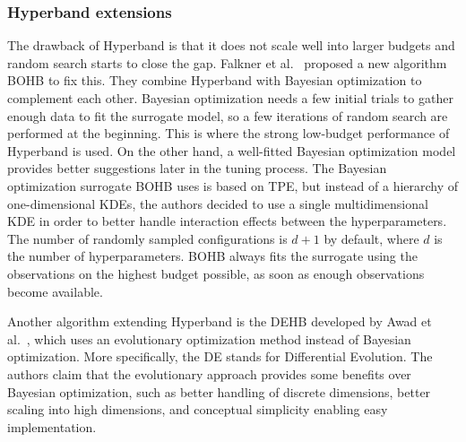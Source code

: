 \subsubsection{Hyperband extensions}
The drawback of Hyperband is that it does not scale well into larger budgets and random search starts to close the gap. Falkner et al.~\cite{falkner2018bohb} proposed a new algorithm BOHB to fix this. They combine Hyperband with Bayesian optimization to complement each other. Bayesian optimization needs a few initial trials to gather enough data to fit the surrogate model, so a few iterations of random search are performed at the beginning. This is where the strong low-budget performance of Hyperband is used. On the other hand, a well-fitted Bayesian optimization model provides better suggestions later in the tuning process. The Bayesian optimization surrogate BOHB uses is based on TPE, but instead of a hierarchy of one-dimensional KDEs, the authors decided to use a single multidimensional KDE in order to better handle interaction effects between the hyperparameters. The number of randomly sampled configurations is $d+1$ by default, where $d$ is the number of hyperparameters. BOHB always fits the surrogate using the observations on the highest budget possible, as soon as enough observations become available.


Another algorithm extending Hyperband is the DEHB developed by Awad et al.~\cite{awad2021dehb}, which uses an evolutionary optimization method instead of Bayesian optimization. More specifically, the DE stands for Differential Evolution. The authors claim that the evolutionary approach provides some benefits over Bayesian optimization, such as better handling of discrete dimensions, better scaling into high dimensions, and conceptual simplicity enabling easy implementation.

